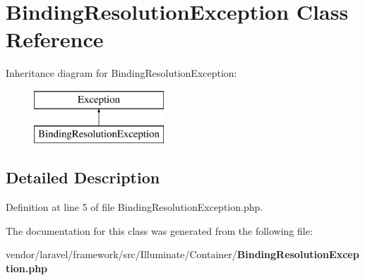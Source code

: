 \section{Binding\+Resolution\+Exception Class Reference}
\label{class_illuminate_1_1_container_1_1_binding_resolution_exception}
Inheritance diagram for Binding\+Resolution\+Exception\+:\begin{figure}[H]
\begin{center}
\leavevmode
\includegraphics[height=2.000000cm]{class_illuminate_1_1_container_1_1_binding_resolution_exception}
\end{center}
\end{figure}


\subsection{Detailed Description}


Definition at line 5 of file Binding\+Resolution\+Exception.\+php.



The documentation for this class was generated from the following file\+:\begin{DoxyCompactItemize}
\item 
vendor/laravel/framework/src/\+Illuminate/\+Container/{\bf Binding\+Resolution\+Exception.\+php}\end{DoxyCompactItemize}
